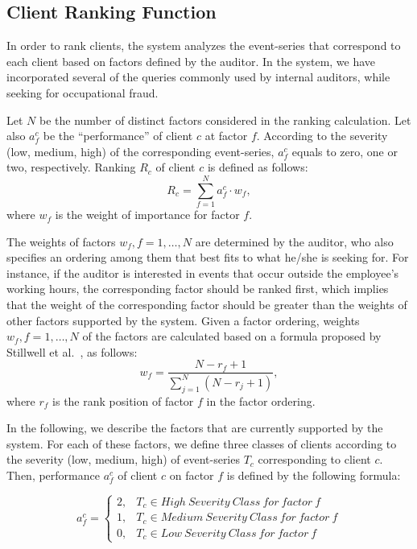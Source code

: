 \documentclass[conference]{IEEEtran}
\begin{document}
\subsection{Client Ranking Function}
\label{sec:client-ranking}

In order to rank clients, the system analyzes the event-series that
correspond to each client based on factors defined by the auditor.
In the system, we have incorporated several of the queries commonly
used by internal auditors, while seeking for occupational fraud.

Let $N$ be the number of distinct factors considered in the ranking
calculation. Let also $a_f^c$ be the ``performance'' of client $c$
at factor $f$. According to the severity (low, medium, high) of the
corresponding event-series, $a_f^c$ equals to zero, one or two,
respectively. Ranking $R_c$ of client $c$ is defined as follows:
$$R_c = \sum\limits_{f=1}^Na_f^c \cdot w_f,$$ where $w_f$ is the weight of importance
for factor $f$.

The weights of factors $w_f, f=1,\ldots,N$ are determined by the
auditor, who also specifies an ordering among them that best fits to
what he/she is seeking for. For instance, if the auditor is
interested in events that occur outside the employee's working
hours, the corresponding factor should be ranked first, which
implies that the weight of the corresponding factor should be
greater than the weights of other factors supported by the system.
Given a factor ordering, weights $w_f, f=1,\ldots,N$ of the factors
are calculated based on a formula proposed by Stillwell et
al.~\cite{SSE81}, as follows:
$$w_f = \frac{N-r_f+1}{\sum\limits_{j=1}^N(N-r_j+1)},$$
where $r_f$ is the rank position of factor $f$ in the factor
ordering.

In the following, we describe the factors that are currently
supported by the system. For each of these factors, we define three
classes of clients according to the severity (low, medium, high) of
event-series $T_c$ corresponding to client $c$. Then, performance
$a_f^c$ of client $c$ on factor $f$ is defined by the following
formula:

   \begin{displaymath}
    a_f^c = \left\{
        \begin{array}{lr}
        2, & T_c \in High~Severity~Class~for~factor~f~~~~~\\
        1, & T_c \in Medium~Severity~Class~for~factor~f\\
        0, & T_c \in Low~Severity~Class~for~factor~f~~~~~~~
        \end{array}
    \right.
    \end{displaymath}
\end{document}
